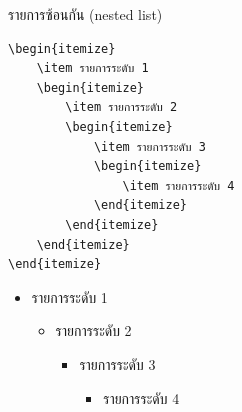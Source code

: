 \begin{exampleBox}[sidebyside]{รายการซ้อนกัน (nested list)}
\small
\begin{lstlisting}[frame=none,language={[LaTeX]TeX}]
\begin{itemize}
    \item รายการระดับ 1
    \begin{itemize}
        \item รายการระดับ 2
        \begin{itemize}
            \item รายการระดับ 3
            \begin{itemize}
                \item รายการระดับ 4
            \end{itemize}
        \end{itemize}
    \end{itemize}
\end{itemize}
\end{lstlisting}
\tcblower
\small
\begin{itemize}[noitemsep,leftmargin=*,label=\textbullet]
    \item รายการระดับ 1
    \begin{itemize}
        \item รายการระดับ 2
        \begin{itemize}
            \item รายการระดับ 3
            \begin{itemize}
                \item รายการระดับ 4
            \end{itemize}
        \end{itemize}
    \end{itemize}
\end{itemize}
\end{exampleBox}


